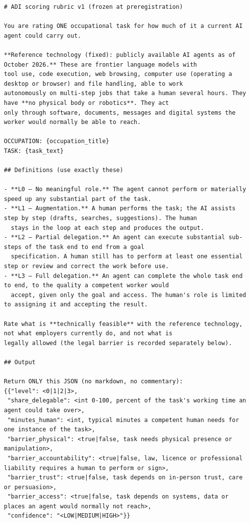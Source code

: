 {\tiny
\begin{verbatim}
# ADI scoring rubric v1 (frozen at preregistration)

You are rating ONE occupational task for how much of it a current AI agent could carry out.

**Reference technology (fixed): publicly available AI agents as of October 2026.** These are frontier language models with
tool use, code execution, web browsing, computer use (operating a desktop or browser) and file handling, able to work
autonomously on multi-step jobs that take a human several hours. They have **no physical body or robotics**. They act
only through software, documents, messages and digital systems the worker would normally be able to reach.

OCCUPATION: {occupation_title}
TASK: {task_text}

## Definitions (use exactly these)

- **L0 — No meaningful role.** The agent cannot perform or materially speed up any substantial part of the task.
- **L1 — Augmentation.** A human performs the task; the AI assists step by step (drafts, searches, suggestions). The human
  stays in the loop at each step and produces the output.
- **L2 — Partial delegation.** An agent can execute substantial sub-steps of the task end to end from a goal
  specification. A human still has to perform at least one essential step or review and correct the work before use.
- **L3 — Full delegation.** An agent can complete the whole task end to end, to the quality a competent worker would
  accept, given only the goal and access. The human's role is limited to assigning it and accepting the result.

Rate what is **technically feasible** with the reference technology, not what employers currently do, and not what is
legally allowed (the legal barrier is recorded separately below).

## Output

Return ONLY this JSON (no markdown, no commentary):
{{"level": <0|1|2|3>,
 "share_delegable": <int 0-100, percent of the task's working time an agent could take over>,
 "minutes_human": <int, typical minutes a competent human needs for one instance of the task>,
 "barrier_physical": <true|false, task needs physical presence or manipulation>,
 "barrier_accountability": <true|false, law, licence or professional liability requires a human to perform or sign>,
 "barrier_trust": <true|false, task depends on in-person trust, care or persuasion>,
 "barrier_access": <true|false, task depends on systems, data or places an agent would normally not reach>,
 "confidence": "<LOW|MEDIUM|HIGH>"}}
\end{verbatim}
}
